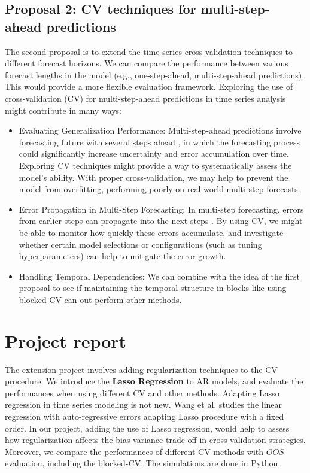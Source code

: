 \documentclass[12pt, oneside]{amsart}
\theoremstyle{definition}
\theoremstyle{remark}
\numberwithin{equation}{section}
\begin{document}
\subsection{Proposal 2: CV techniques for multi-step-ahead predictions} %
The second proposal is to extend the time series cross-validation techniques to different forecast horizons. We can compare the performance between various forecast lengths in the model (e.g., one-step-ahead, multi-step-ahead predictions). This would provide a more flexible evaluation framework. Exploring the use of cross-validation (CV) for multi-step-ahead predictions in time series analysis might contribute in many ways:

\begin{itemize}
    \item Evaluating Generalization Performance: Multi-step-ahead predictions involve forecasting future with several steps ahead \citep{Cheng}, in which the forecasting process could significantly increase uncertainty and error accumulation over time. Exploring CV techniques might provide a way to systematically assess the model's ability. With proper cross-validation, we may help to prevent the model from overfitting, performing poorly on real-world multi-step forecasts. 
    \item Error Propagation in Multi-Step Forecasting: In multi-step forecasting, errors from earlier steps can propagate into the next steps \citep{Cheng}. By using CV, we might be able to monitor how quickly these errors accumulate, and investigate whether certain model selections or configurations (such as tuning hyperparameters) can help to mitigate the error growth.
    \item Handling Temporal Dependencies: We can combine with the idea of the first proposal to see if maintaining the temporal structure in blocks like using blocked-CV can out-perform other methods.
\end{itemize}

\section{Project report}
The extension project involves adding regularization techniques to the CV procedure. We introduce the \textbf{Lasso Regression} to AR models, and evaluate the performances when using different CV and other methods. Adapting Lasso regression in time series modeling is not new. Wang et al. \citep{Wang} studies the linear regression with auto-regressive errors adapting Lasso procedure with a fixed order. In our project, adding the use of Lasso regression, would help to assess how regularization affects the bias-variance trade-off in cross-validation strategies. Moreover, we compare the performances of different CV methods with $OOS$ evaluation, including the blocked-CV. The simulations are done in Python. 
\end{document}
